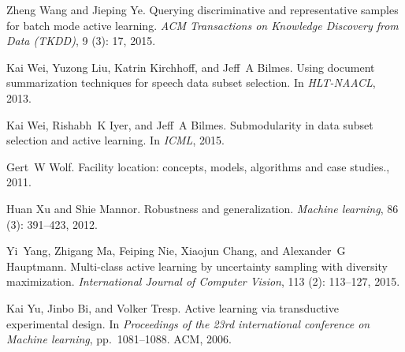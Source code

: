 \documentclass{article} \usepackage{iclr2018_conference,times}
\begin{document}
\begin{thebibliography}{51}
Zheng Wang and Jieping Ye.
\newblock Querying discriminative and representative samples for batch mode
  active learning.
\newblock \emph{ACM Transactions on Knowledge Discovery from Data (TKDD)},
  9 (3): 17, 2015.

Kai Wei, Yuzong Liu, Katrin Kirchhoff, and Jeff~A Bilmes.
\newblock Using document summarization techniques for speech data subset
  selection.
\newblock In \emph{HLT-NAACL}, 2013.

Kai Wei, Rishabh~K Iyer, and Jeff~A Bilmes.
\newblock Submodularity in data subset selection and active learning.
\newblock In \emph{ICML}, 2015.

Gert~W Wolf.
\newblock Facility location: concepts, models, algorithms and case studies.,
  2011.

Huan Xu and Shie Mannor.
\newblock Robustness and generalization.
\newblock \emph{Machine learning}, 86 (3): 391--423, 2012.

Yi~Yang, Zhigang Ma, Feiping Nie, Xiaojun Chang, and Alexander~G Hauptmann.
\newblock Multi-class active learning by uncertainty sampling with diversity
  maximization.
\newblock \emph{International Journal of Computer Vision}, 113
  (2): 113--127, 2015.

Kai Yu, Jinbo Bi, and Volker Tresp.
\newblock Active learning via transductive experimental design.
\newblock In \emph{Proceedings of the 23rd international conference on Machine
  learning}, pp.\  1081--1088. ACM, 2006.

\end{thebibliography}


\appendix
\end{document}
